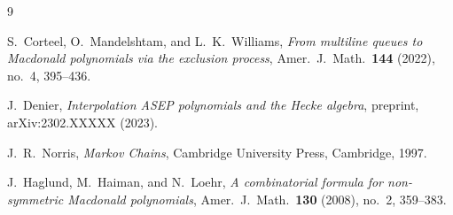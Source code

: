 \documentclass[12pt]{article}
\begin{document}
\begin{thebibliography}{9}

S.~Corteel, O.~Mandelshtam, and L.~K.~Williams,
\textit{From multiline queues to Macdonald polynomials via the exclusion process},
Amer.\ J.\ Math.\ \textbf{144} (2022), no.~4, 395--436.

J.~Denier,
\textit{Interpolation ASEP polynomials and the Hecke algebra},
preprint, arXiv:2302.XXXXX (2023).

J.~R.~Norris,
\textit{Markov Chains},
Cambridge University Press, Cambridge, 1997.

J.~Haglund, M.~Haiman, and N.~Loehr,
\textit{A combinatorial formula for non-symmetric Macdonald polynomials},
Amer.\ J.\ Math.\ \textbf{130} (2008), no.~2, 359--383.

\end{thebibliography}
\end{document}
